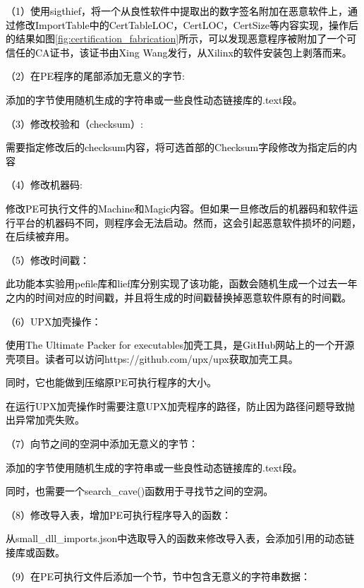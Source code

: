 \textcolor{black}{（1）使用sigthief，将一个从良性软件中提取出的数字签名附加在恶意软件上，通过修改ImportTable中的CertTableLOC，CertLOC，CertSize等内容实现，操作后的结果如图\ref{fig:certification_fabrication}所示，可以发现恶意程序被附加了一个可信任的CA证书，该证书由Xing Wang发行，从Xilinx的软件安装包上剥落而来。}

\textcolor{black}{（2）在PE程序的尾部添加无意义的字节:}

\textcolor{black}{添加的字节使用随机生成的字符串或一些良性动态链接库的.text段。}

\textcolor{black}{（3）修改校验和（checksum）:}

\textcolor{black}{需要指定修改后的checksum内容，将可选首部的Checksum字段修改为指定后的内容}

\textcolor{black}{（4）修改机器码:}

\textcolor{black}{修改PE可执行文件的Machine和Magic内容。但如果一旦修改后的机器码和软件运行平台的机器码不同，则程序会无法启动。然而，这会引起恶意软件损坏的问题，在后续被弃用。}

\textcolor{black}{（5）修改时间戳：}

\textcolor{black}{此功能本实验用pefile库和lief库分别实现了该功能，函数会随机生成一个过去一年之内的时间对应的时间戳，并且将生成的时间戳替换掉恶意软件原有的时间戳。}

\textcolor{black}{（6）UPX加壳操作：}

\textcolor{black}{使用The Ultimate Packer for executables加壳工具，是GitHub网站上的一个开源壳项目。读者可以访问https://github.com/upx/upx获取加壳工具。}

\textcolor{black}{同时，它也能做到压缩原PE可执行程序的大小。}

\textcolor{black}{在运行UPX加壳操作时需要注意UPX加壳程序的路径，防止因为路径问题导致抛出异常加壳失败。}

\textcolor{black}{（7）向节之间的空洞中添加无意义的字节：}

\textcolor{black}{添加的字节使用随机生成的字符串或一些良性动态链接库的.text段。}

\textcolor{black}{同时，也需要一个search\_cave()函数用于寻找节之间的空洞。}

\textcolor{black}{（8）修改导入表，增加PE可执行程序导入的函数：}

\textcolor{black}{从small\_dll\_imports.json中选取导入的函数来修改导入表，会添加引用的动态链接库或函数。}

\textcolor{black}{（9）在PE可执行文件后添加一个节，节中包含无意义的字符串数据：}

